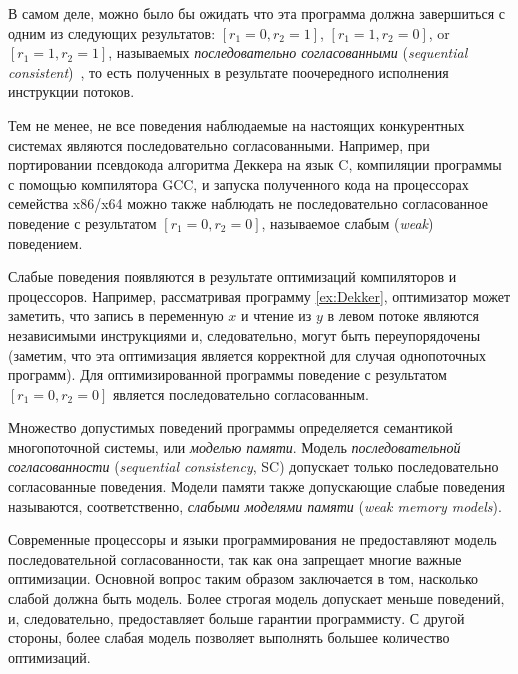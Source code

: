 В самом деле, можно было бы ожидать что эта программа 
должна завершиться с одним из следующих результатов: 
${[r_1=0, r_2=1]}$, ${[r_1=1,r_2=0]}$, or ${[r_1=1,r_2=1]}$,
называемых \emph{последовательно согласованными} 
(\emph{sequential consistent})~\cite{Lamport:TC79},
то есть полученных в результате поочередного 
исполнения инструкции потоков. 



Тем не менее, не все поведения наблюдаемые на настоящих
конкурентных системах являются последовательно согласованными.
Например, при портировании псевдокода алгоритма Деккера
на язык C, компиляции программы с помощью компилятора GCC, 
и запуска полученного кода на процессорах семейства x86/x64
можно также наблюдать не последовательно согласованное поведение
с результатом $[r_1=0, r_2=0]$, называемое слабым (\emph{weak}) поведением.

Слабые поведения появляются в результате оптимизаций 
компиляторов и процессоров. Например, 
рассматривая программу \ref{ex:Dekker}, 
оптимизатор может заметить, что запись в переменную $x$
и чтение из $y$ в левом потоке являются независимыми инструкциями 
и, следовательно, могут быть переупорядочены
(заметим, что эта оптимизация является корректной 
для случая однопоточных программ).
Для оптимизированной программы поведение с результатом
$[r_1=0, r_2=0]$ является последовательно согласованным.

Множество допустимых поведений программы определяется
семантикой многопоточной системы, или \emph{моделью памяти}.
Модель \emph{последовательной согласованности}
(\emph{sequential consistency}, SC) допускает 
только последовательно согласованные поведения.
Модели памяти также допускающие слабые поведения 
называются, соответственно, \emph{слабыми моделями памяти}
(\emph{weak memory models}).

Современные процессоры и языки программирования 
не предоставляют модель последовательной согласованности, 
так как она запрещает многие важные оптимизации.
Основной вопрос таким образом заключается в том, насколько слабой 
должна быть модель. Более строгая модель допускает меньше поведений, 
и, следовательно, предоставляет больше гарантии программисту.
С другой стороны, более слабая модель позволяет
выполнять большее количество оптимизаций.

